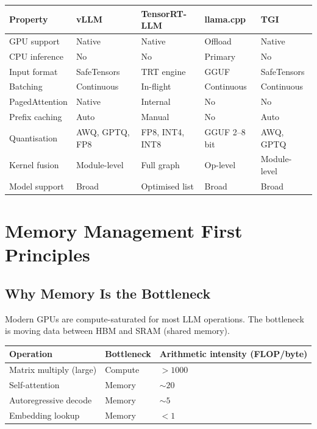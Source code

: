 \documentclass[11pt,a4paper]{article}
\theoremstyle{definition}
\begin{document}
\begin{longtable}{p{2.5cm}p{3cm}p{3cm}p{3cm}p{3cm}}
	\toprule
	\textbf{Property} & \textbf{vLLM}  & \textbf{TensorRT-LLM} & \textbf{llama.cpp} & \textbf{TGI} \\
	\midrule
	GPU support       & Native         & Native                & Offload            & Native       \\
	CPU inference     & No             & No                    & Primary            & No           \\
	Input format      & SafeTensors    & TRT engine            & GGUF               & SafeTensors  \\
	Batching          & Continuous     & In-flight             & Continuous         & Continuous   \\
	PagedAttention    & Native         & Internal              & No                 & No           \\
	Prefix caching    & Auto           & Manual                & No                 & Auto         \\
	Quantisation      & AWQ, GPTQ, FP8 & FP8, INT4, INT8       & GGUF 2--8 bit      & AWQ, GPTQ    \\
	Kernel fusion     & Module-level   & Full graph            & Op-level           & Module-level \\
	Model support     & Broad          & Optimised list        & Broad              & Broad        \\
	\bottomrule
\end{longtable}

\section{Memory Management First Principles}
\label{sec:memory}

\subsection{Why Memory Is the Bottleneck}

Modern GPUs are compute-saturated for most LLM operations. The bottleneck is moving data between HBM and SRAM (shared memory).

\begin{center}
	\begin{tabular}{lll}
		\toprule
		\textbf{Operation}      & \textbf{Bottleneck} & \textbf{Arithmetic intensity (FLOP/byte)} \\
		\midrule
		Matrix multiply (large) & Compute             & $>1000$                                   \\
		Self-attention          & Memory              & $\sim 20$                                 \\
		Autoregressive decode   & Memory              & $\sim 5$                                  \\
		Embedding lookup        & Memory              & $<1$                                      \\
		\bottomrule
	\end{tabular}
\end{center}
\end{document}
